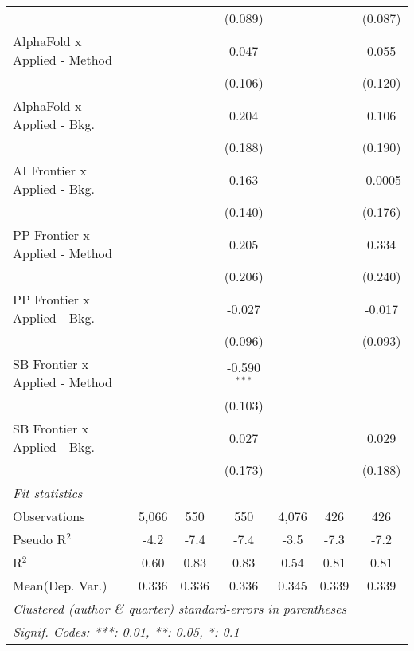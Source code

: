 \begin{tabular}{lcccccc}
                                  &         &              & (0.089)        &              &             & (0.087)\\   
   AlphaFold x Applied - Method   &         &              & 0.047          &              &             & 0.055\\   
                                  &         &              & (0.106)        &              &             & (0.120)\\   
   AlphaFold x Applied - Bkg.     &         &              & 0.204          &              &             & 0.106\\   
                                  &         &              & (0.188)        &              &             & (0.190)\\   
   AI Frontier x Applied - Bkg.   &         &              & 0.163          &              &             & -0.0005\\   
                                  &         &              & (0.140)        &              &             & (0.176)\\   
   PP Frontier x Applied - Method &         &              & 0.205          &              &             & 0.334\\   
                                  &         &              & (0.206)        &              &             & (0.240)\\   
   PP Frontier x Applied - Bkg.   &         &              & -0.027         &              &             & -0.017\\   
                                  &         &              & (0.096)        &              &             & (0.093)\\   
   SB Frontier x Applied - Method &         &              & -0.590$^{***}$ &              &             &   \\   
                                  &         &              & (0.103)        &              &             &   \\   
   SB Frontier x Applied - Bkg.   &         &              & 0.027          &              &             & 0.029\\   
                                  &         &              & (0.173)        &              &             & (0.188)\\   
   \midrule
   \emph{Fit statistics}\\
   Observations                   & 5,066   & 550          & 550            & 4,076        & 426         & 426\\  
   Pseudo R$^2$                   & -4.2    & -7.4         & -7.4           & -3.5         & -7.3        & -7.2\\  
   R$^2$                          & 0.60    & 0.83         & 0.83           & 0.54         & 0.81        & 0.81\\  
Mean(Dep. Var.) & 0.336 & 0.336 & 0.336 & 0.345 & 0.339 & 0.339 \\
   \midrule \midrule
   \multicolumn{7}{l}{\emph{Clustered (author \& quarter) standard-errors in parentheses}}\\
   \multicolumn{7}{l}{\emph{Signif. Codes: ***: 0.01, **: 0.05, *: 0.1}}\\
\end{tabular}
\par\endgroup
